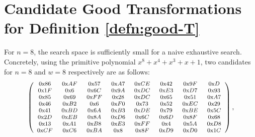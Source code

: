 \documentclass[journal=tosc,final,nohyperref]{iacrtrans}
\begin{document}
%



\appendix


\section{Candidate Good Transformations for Definition \ref{defn:good-T}}
\label{sec:candidates-good-linear}

For $n=8$, the search space is sufficiently small for a naive exhaustive search. Concretely, using the primitive polynomial $x^8+x^4+x^3+x+1$, two candidates for $n = 8$ and $w = 8$ respectively are as follows:
\small
\[\footnotesize
\left(
\begin{array}{cccccccc}
\text{0x}86~& \text{0x}AF~& \text{0x}57~& \text{0x}A7~& \text{0x}CE~& \text{0x}42~& \text{0x}9F~& \text{0x}D\\
\text{0x}1F~& \text{0x}6~& \text{0x}6C~& \text{0x}9A~& \text{0x}DC~& \text{0x}E3~& \text{0x}D7~& \text{0x}93\\
\text{0x}85~& \text{0x}69~& \text{0x}FF~& \text{0x}28~& \text{0x}DC~& \text{0x}65~& \text{0x}51~& \text{0x}A7\\
\text{0x}46~& \text{0x}B2~& \text{0x}6~& \text{0x}F0~& \text{0x}73~& \text{0x}52~& \text{0x}EC~& \text{0x}29\\
\text{0x}41~& \text{0x}BD~& \text{0x}6A~& \text{0x}B3~& \text{0x}DE~& \text{0x}79~& \text{0x}BE~& \text{0x}5C\\
\text{0x}2D~& \text{0x}EB~& \text{0x}8A~& \text{0x}D6~& \text{0x}6C~& \text{0x}6D~& \text{0x}8F~& \text{0x}68\\
\text{0x}13~& \text{0x}A1~& \text{0x}B8~& \text{0x}E3~& \text{0x}FF~& \text{0x}4~& \text{0x}5A~& \text{0x}D8\\
\text{0x}CF~& \text{0x}C6~& \text{0x}BA~& \text{0x}8~& \text{0x}8F~& \text{0x}D9~& \text{0x}D0~& \text{0x}1C
\end{array}
\right),
\]
\end{document}
